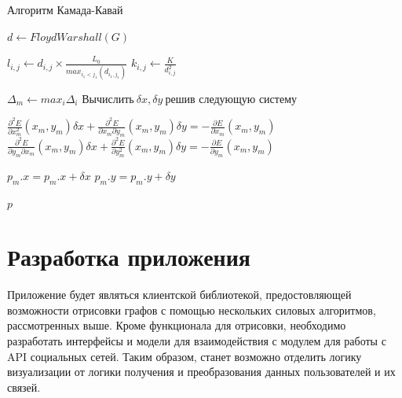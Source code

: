 \documentclass[14pt, russian]{scrartcl}
\begin{document}
\begin{algorithm}[H]
\caption{Алгоритм Камада-Кавай}\label{alg:kk}
\begin{algorithmic}
  
  \State $d \gets FloydWarshall(G)$
  
	\State {}
        \State $l_{i,j} \gets d_{i, j} \times \frac{L_0}{max_{i_1 < j_1}(d_{i_1, j_1})} $ 
        \State $k_{i,j} \gets \frac{K}{d^{2}_{i, j}} $ 
       
      \EndIf
     
  
    \EndFor
  \EndFor

  \State {}
  
  \State $\Delta_m \gets max_i \Delta_i$
   \State $\text{Вычислить} \ \delta x, \delta y \ \text{решив следующую систему}$
  
   \State $ \frac{\partial^2 E}{\partial x^{2}_m}(x_m, y_m)\delta x + \frac{\partial^2 E}{\partial x_m \partial y_m}(x_m, y_m)\delta y = -\frac{\partial E}{\partial x_m}(x_m, y_m) $
   \State $ \frac{\partial^2 E}{\partial y_m \partial x_m}(x_m, y_m)\delta x + \frac{\partial^2 E}{\partial y^{2}_m}(x_m, y_m)\delta y = -\frac{\partial E}{\partial y_m}(x_m, y_m) $

   \State $p_m.x = p_m.x + \delta x$
   \State $p_m.y = p_m.y + \delta y$
  \EndWhile
  \EndWhile
  
	\State \Return $p$
	\EndFunction

\end{algorithmic}
\end{algorithm}




\section{Разработка приложения}


Приложение будет являться клиентской библиотекой,
 предостовляющей возможности отрисовки графов с помощью нескольких силовых алгоритмов, рассмотренных выше.
Кроме функционала для отрисовки, необходимо разработать интерфейсы и модели 
для взаимодействия с модулем для работы с API социальных сетей.
Таким образом, станет возможно отделить логику визуализации от логики получения и преобразования данных пользователей и их связей. 
\end{document}
